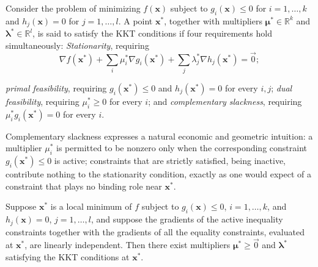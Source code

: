 \begin{definition}
Consider the problem of minimizing $f(\mathbf{x})$ subject to $g_i(\mathbf{x}) \leq 0$ for $i=1,\dots,k$ and $h_j(\mathbf{x}) = 0$ for $j=1,\dots,l$. A point $\mathbf{x}^*$, together with multipliers $\boldsymbol{\mu}^* \in \mathbb{R}^k$ and $\boldsymbol{\lambda}^* \in \mathbb{R}^l$, is said to satisfy the KKT conditions if four requirements hold simultaneously: \textit{Stationarity}, requiring
\[
\nabla f(\mathbf{x}^*) + \sum_i \mu_i^* \nabla g_i(\mathbf{x}^*) + \sum_j \lambda_j^* \nabla h_j(\mathbf{x}^*) = \vec{0};
\]

\textit{primal feasibility}, requiring $g_i(\mathbf{x}^*) \leq 0$ and $h_j(\mathbf{x}^*) = 0$ for every $i,j$; \textit{dual feasibility}, requiring $\mu_i^* \geq 0$ for every $i$; and \textit{complementary slackness}, requiring $\mu_i^* g_i(\mathbf{x}^*) = 0$ for every $i$.
\end{definition}

Complementary slackness expresses a natural economic and geometric intuition: a multiplier $\mu_i^*$ is permitted to be nonzero only when the corresponding constraint $g_i(\mathbf{x}^*) \leq 0$ is active; constraints that are strictly satisfied, being inactive, contribute nothing to the stationarity condition, exactly as one would expect of a constraint that plays no binding role near $\mathbf{x}^*$.

\begin{theorem}
Suppose $\mathbf{x}^*$ is a local minimum of $f$ subject to $g_i(\mathbf{x}) \leq 0$, $i=1,\dots,k$, and $h_j(\mathbf{x})=0$, $j=1,\dots,l$, and suppose the gradients of the active inequality constraints together with the gradients of all the equality constraints, evaluated at $\mathbf{x}^*$, are linearly independent. Then there exist multipliers $\boldsymbol{\mu}^* \geq \vec{0}$ and $\boldsymbol{\lambda}^*$ satisfying the KKT conditions at $\mathbf{x}^*$.
\end{theorem}

